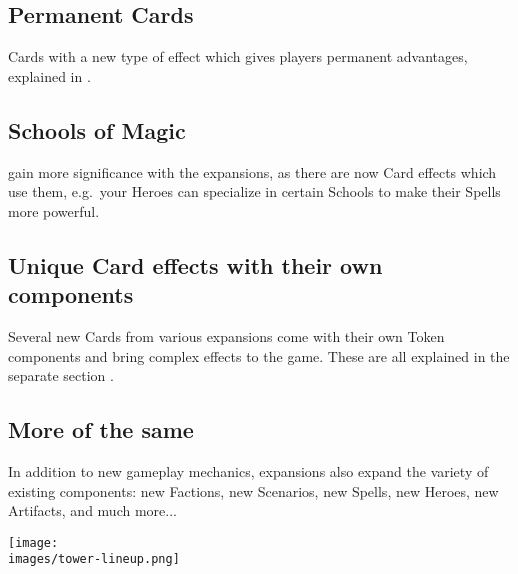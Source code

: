 \begin{multicols*}{2}
\subsection*{Permanent Cards}
Cards with a new type of effect which gives players permanent advantages, explained in .

\subsection*{Schools of Magic}
 gain more significance with the expansions, as there are now Card effects which use them, e.g.~your Heroes can specialize in certain Schools to make their Spells more powerful.

\subsection*{Unique Card effects with their own components}
Several new Cards from various expansions come with their own Token components and bring complex effects to the game.
These are all explained in the separate section .

\subsection*{More of the same}
In addition to new gameplay mechanics, expansions also expand the variety of existing components: new Factions, new Scenarios, new Spells, new Heroes, new Artifacts, and much more...

\begin{center}
    \texttt{[image: \\images/tower-lineup.png]}
\end{center}
\vspace*{\fill}
\end{multicols*}
\pagebreak

